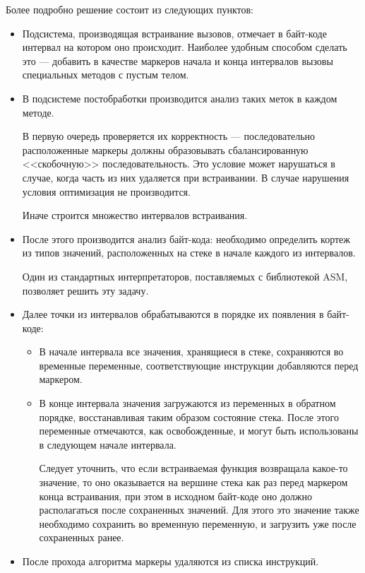 Более подробно решение состоит из следующих пунктов:
\begin{itemize}
    \item Подсистема, производящая встраивание вызовов, отмечает в байт-коде интервал
    на котором оно происходит.
    Наиболее удобным способом сделать это --- добавить в качестве маркеров начала и конца
    интервалов вызовы специальных методов с пустым телом.

    \item В подсистеме постобработки производится анализ таких меток в каждом методе.

    В первую очередь проверяется их корректность --- последовательно расположенные маркеры должны
    образовывать сбалансированную <<скобочную>> последовательность.
    Это условие может нарушаться в случае, когда часть из них удаляется при встраивании.
    В случае нарушения условия оптимизация не производится.

    Иначе строится множество интервалов встраивания.

    \item После этого производится анализ байт-кода: необходимо определить кортеж из типов
    значений, расположенных на стеке в начале каждого из интервалов.

    Один из стандартных интерпретаторов, поставляемых с библиотекой ASM, позволяет решить эту
    задачу.

    \item Далее точки из интервалов обрабатываются в порядке их появления в байт-коде:
    \begin{itemize}
        \item В начале интервала все значения, хранящиеся в стеке,
        сохраняются во временные переменные, соответствующие инструкции добавляются перед маркером.
        \item В конце интервала значения загружаются из переменных в обратном порядке,
        восстанавливая таким образом состояние стека.
        После этого переменные отмечаются, как освобожденные, и могут быть использованы
        в следующем начале интервала.

        Следует уточнить, что если встраиваемая функция возвращала какое-то значение, то оно
        оказывается на вершине стека как раз перед маркером конца встраивания, при этом
        в исходном байт-коде оно должно располагаться после сохраненных значений.
        Для этого это значение также необходимо сохранить во временную переменную, и загрузить
        уже после сохраненных ранее.
    \end{itemize}

    \item После прохода алгоритма маркеры удаляются из списка инструкций.
\end{itemize}

